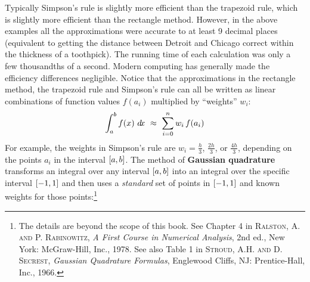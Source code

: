 Typically Simpson's rule is slightly more efficient than the trapezoid rule,
which is slightly more efficient than the rectangle method. However, in the
above examples all the approximations were accurate to at least 9 decimal places
(equivalent to getting the distance between Detroit and Chicago correct within
the thickness of a toothpick). The running time of each calculation was only a
few thousandths of a second. Modern computing has generally made the efficiency
differences negligible.
\newpage
Notice that the approximations in the rectangle method, the trapezoid rule and
Simpson's rule can all be written as linear combinations of function values
$f(a_i)$ multiplied by ``weights'' $w_i$:
\[
\int_a^b f(x)~d\!x ~\approx~ \sum_{i=0}^{n} w_i\,f(a_i)
\]
For example, the weights in Simpson's rule are $w_i = \frac{h}{3}$,
$\frac{2h}{3}$, or $\frac{4h}{3}$, depending on the points $a_i$ in the interval
$\lbrack a,b \rbrack$. The method of \textbf{Gaussian quadrature} transforms an integral
over any interval $\lbrack a,b \rbrack$ into an integral over the specific interval
$\lbrack -1,1 \rbrack$ and then uses a \emph{standard} set of points in $\lbrack -1,1 \rbrack$
and known weights for those points:\footnote{The details are beyond the scope of
this book. See Chapter 4 in \textsc{Ralston, A. and P. Rabinowitz}, \emph{A
First Course in Numerical Analysis}, 2nd ed., New York: McGraw-Hill, Inc.,
1978. See also Table 1 in \textsc{Stroud, A.H. and D. Secrest}, \emph{Gaussian
Quadrature Formulas}, Englewood Cliffs, NJ: Prentice-Hall, Inc., 1966.}

\vspace{-3mm}

